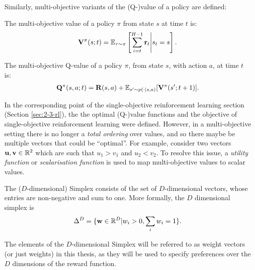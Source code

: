     Similarly, multi-objective variants of the (Q-)value of a policy are defined:    
    \begin{defn}
        \label{def:2:mo_value}
        \label{def:2:mo_q_value}
        The \textnormal{multi-objective value} of a policy $\pi$ from state $s$ at time $t$ is:
        \begin{align}
            \mathbf{V}^{\pi}(s;t) = \mathbb{E}_{\mathbf{\tau}\sim\pi}\left[\sum_{i=t}^{H-1} \mathbf{r}_t \Bigg| s_t=s \right]. \label{eq:2:mo_value_fn_def}
        \end{align} 

        The \textnormal{multi-objective Q-value} of a policy $\pi$, from state $s$, with action $a$, at time $t$ is:
        \begin{align}
            \mathbf{Q}^{\pi}(s,a;t) = \mathbf{R}(s,a) + \mathbb{E}_{s'\sim p(\cdot|s,a)} [\mathbf{V}^{\pi}(s';t+1)]. \label{eq:2:mo_q_value_fn_def}
        \end{align} 
    \end{defn}

    In the corresponding point of the single-objective reinforcement learning section (Section \ref{sec:2-3-rl}), the the optimal (Q-)value functions and the objective of single-objective reinforcement learning were defined. However, in a multi-objective setting there is no longer a \textit{total ordering} over values, and so there maybe be multiple vectors that could be ``optimal''. For example, consider two vectors $\mathbf{u},\mathbf{v}\in\mathbb{R}^2$ which are such that $u_1 > v_1$ and $u_2 < v_2$. To resolve this issue, a \textit{utility function} or \textit{scalarisation function} is used to map multi-objective values to scalar values.

    \begin{defn}
        \label{def:2:simplex}
        \label{def:2:weight}
        \label{def:2:context}
        The \textnormal{($D$-dimensional) Simplex} consists of the set of $D$-dimensional vectors, whose entries are non-negative and sum to one. More formally, the $D$ dimensional simplex is 
        \begin{align}
            \Delta^D = \{\mathbf{w}\in\mathbb{R}^D|w_i > 0, \sum_i w_i = 1\}. \label{eq:2:simplex_def}
        \end{align}

        The elements of the $D$-dimensional Simplex will be referred to as \textnormal{weight vectors} (or just \textnormal{weights}) in this thesis, as they will be used to specify preferences over the $D$ dimensions of the reward function.
    \end{defn}

